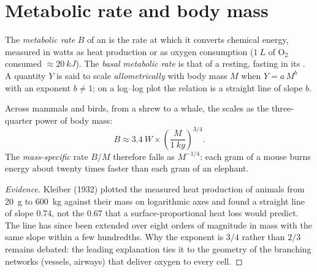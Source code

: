 \section{Metabolic rate and body mass}

\begin{definition}\label{def:b1:organism-environment:allometry}
The \emph{metabolic rate} $B$ of an  is
the rate at which it converts chemical energy, measured in watts as heat
production or as oxygen consumption ($\qty{1}{L}$ of $\mathrm{O_2}$
consumed $\approx \qty{20}{kJ}$). The \emph{basal metabolic
rate} is that of a resting, fasting
 in its . A quantity $Y$ is said to scale
\emph{allometrically} with body mass $M$ when
$Y = a\,M^{b}$ with an exponent $b \neq 1$; on a log--log plot the
relation is a straight line of slope $b$.
\end{definition}

\begin{theorem}\label{thm:b1:organism-environment:kleiber}
Across mammals and birds, from a shrew to a whale, the  scales as the three-quarter power of body mass:
\[
B \approx \qty{3.4}{W}\times\left(\frac{M}{\qty{1}{kg}}\right)^{3/4}.
\]
The \emph{mass-specific} rate $B/M$ therefore falls as $M^{-1/4}$: each
gram of a mouse burns energy about twenty times faster than each gram of
an elephant.
\end{theorem}
\begin{proof}[Evidence]
Kleiber (1932) plotted the measured heat production of animals from
\qty{20}{g} to \qty{600}{kg} against their mass on logarithmic axes and
found a straight line of slope $0.74$, not the $0.67$ that a
surface-proportional heat loss would predict. The line has since been
extended over eight orders of magnitude in mass with the same slope
within a few hundredths. Why the exponent is $3/4$ rather than $2/3$
remains debated: the leading explanation ties it to the geometry of the
branching networks (vessels, airways) that deliver oxygen to every cell.
\end{proof}

